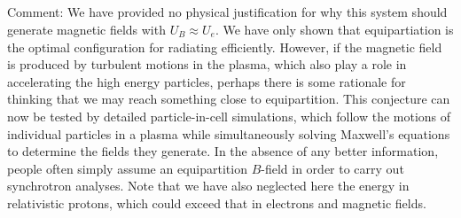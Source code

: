 \documentclass[11pt]{article}
\begin{document}
\subsection*{}

Comment: We have provided no physical justification for why this system should
generate magnetic fields with $U_B\approx U_e$. We have only shown that equipartiation
is the optimal configuration for radiating efficiently. However, if the
magnetic field is produced by turbulent motions in the plasma, which also play
a role in accelerating the high energy particles, perhaps there is some
rationale for thinking that we may reach something close to equipartition. This
conjecture can now be tested by detailed particle-in-cell simulations, which
follow the motions of individual particles in a plasma while simultaneously
solving Maxwell's equations to determine the fields they generate. In the
absence of any better information, people often simply assume an equipartition
$B$-field in order to carry out synchrotron analyses. Note that we have also
neglected here the energy in relativistic protons, which could exceed that in
electrons and magnetic fields.
\end{document}
